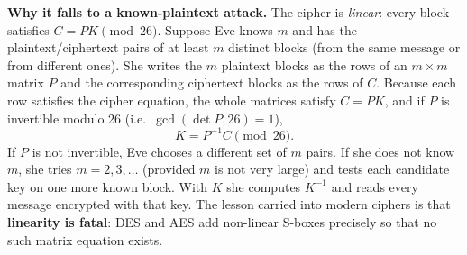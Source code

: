 \textbf{Why it falls to a known-plaintext attack.} The cipher is \emph{linear}: every block satisfies $C = PK \pmod{26}$. Suppose Eve knows $m$ and has the plaintext/ciphertext pairs of at least $m$ distinct blocks (from the same message or from different ones). She writes the $m$ plaintext blocks as the rows of an $m \times m$ matrix $P$ and the corresponding ciphertext blocks as the rows of $C$. Because each row satisfies the cipher equation, the whole matrices satisfy $C = PK$, and if $P$ is invertible modulo 26 (i.e.\ $\gcd(\det P, 26) = 1$),
\[
\boxed{K = P^{-1} C \pmod{26}} .
\]
If $P$ is not invertible, Eve chooses a different set of $m$ pairs. If she does not know $m$, she tries $m = 2, 3, \dots$ (provided $m$ is not very large) and tests each candidate key on one more known block. With $K$ she computes $K^{-1}$ and reads every message encrypted with that key. The lesson carried into modern ciphers is that \textbf{linearity is fatal}: DES and AES add non-linear S-boxes precisely so that no such matrix equation exists.

